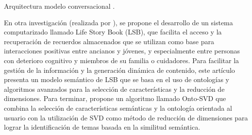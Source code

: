 %
{Arquitectura modelo conversacional \citep{deconversational}.}

En otra investigación (realizada por \cite{shi2012user}), se propone el desarrollo de un sistema computarizado llamado Life Story Book (LSB), que facilita el acceso y la recuperación de recuerdos almacenados que se utilizan como base para interacciones positivas entre ancianos y jóvenes, y especialmente entre personas con deterioro cognitivo y miembros de su familia o cuidadores. Para facilitar la gestión de la información y la generación dinámica de contenido, este artículo presenta un modelo semántico de LSB que se basa en el uso de ontologías y algoritmos avanzados para la selección de características y la reducción de dimensiones. Para terminar, propone un algoritmo llamado Onto-SVD que combina la selección de características semánticas y la ontología orientada al usuario con  la utilización de SVD como método de reducción de dimensiones para lograr la identificación de temas basada en la similitud semántica.

